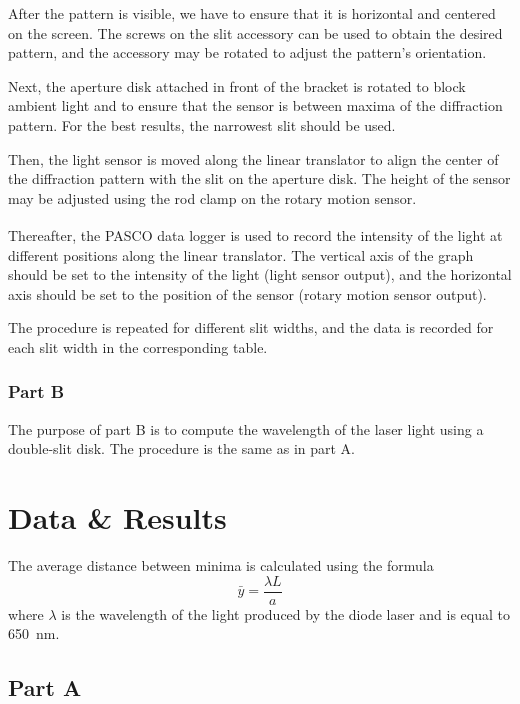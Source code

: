 \documentclass[10pt]{article}
\begin{document}
After the pattern is visible, we have to ensure that it is horizontal and centered on the screen. The screws on the slit accessory can be used to obtain the desired pattern, and the accessory may be rotated to adjust the pattern's orientation.

Next, the aperture disk attached in front of the bracket is rotated to block ambient light and to ensure that the sensor is between maxima of the diffraction pattern. For the best results, the narrowest slit should be used.

Then, the light sensor is moved along the linear translator to align the center of the diffraction pattern with the slit on the aperture disk. The height of the sensor may be adjusted using the rod clamp on the rotary motion sensor.

Thereafter, the PASCO{\textsuperscript\textregistered} data logger is used to record the intensity of the light at different positions along the linear translator. The vertical axis of the graph should be set to the intensity of the light (light sensor output), and the horizontal axis should be set to the position of the sensor (rotary motion sensor output).

The procedure is repeated for different slit widths, and the data is recorded for each slit width in the corresponding table.

\subsubsection*{Part B}

The purpose of part B is to compute the wavelength of the laser light using a double-slit disk. The procedure is the same as in part A.

\section{Data \& Results}

The average distance between minima is calculated using the formula 
\begin{equation}
  \bar{y} = \frac{\lambda L}{a}
\end{equation}
where $\lambda$ is the wavelength of the light produced by the diode laser and is equal to \SI{650}{nm}.

\subsection*{Part A}
\end{document}
